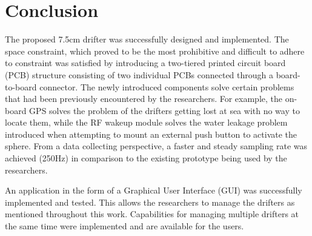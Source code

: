 \section{Conclusion}

The proposed 7.5cm drifter was successfully designed and implemented.  The space constraint, which proved to be the most prohibitive and difficult to adhere to constraint was satisfied by introducing a two-tiered printed circuit board (PCB) structure consisting of two individual PCBs connected through a board-to-board connector.  The newly introduced components solve certain problems that had been previously encountered by the researchers.  For example, the on-board GPS solves the problem of the drifters getting lost at sea with no way to locate them, while the RF wakeup module solves the water leakage problem introduced when attempting to mount an external push button to activate the sphere.  From a data collecting perspective, a faster and steady sampling rate was achieved (250Hz) in comparison to the existing prototype being used by the researchers.  

An application in the form of a Graphical User Interface (GUI) was successfully implemented and tested.  This allows the researchers to manage the drifters as mentioned throughout this work.  Capabilities for managing multiple drifters at the same time were implemented and are available for the users.